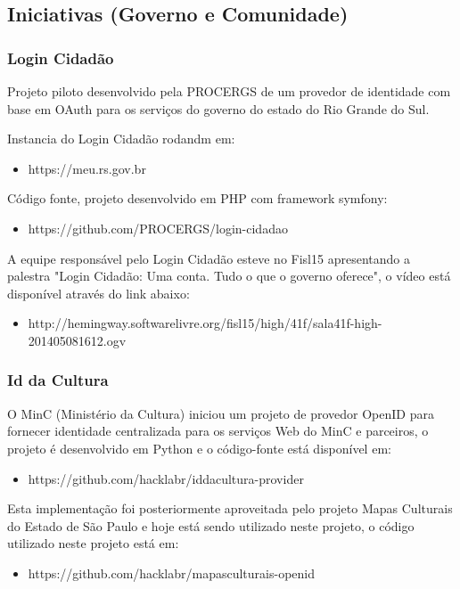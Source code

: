 \documentclass[11pt]{article}
\begin{document}
\subsection{Iniciativas (Governo e Comunidade)}

\subsubsection{Login Cidadão}

Projeto piloto desenvolvido pela PROCERGS de um provedor de identidade com
base em OAuth para os serviços do governo do estado do Rio Grande do Sul.

Instancia do Login Cidadão rodandm em:
\begin{itemize}
  \item{https://meu.rs.gov.br}
\end{itemize}

Código fonte, projeto desenvolvido em PHP com framework symfony:
\begin{itemize}
  \item{https://github.com/PROCERGS/login-cidadao}
\end{itemize}

A equipe responsável pelo Login Cidadão esteve no Fisl15 apresentando a
palestra "Login Cidadão: Uma conta. Tudo o que o governo oferece", o vídeo
está disponível através do link abaixo:
\begin{itemize}
  \item{http://hemingway.softwarelivre.org/fisl15/high/41f/sala41f-high-201405081612.ogv}
\end{itemize}

\subsubsection{Id da Cultura}

O MinC (Ministério da Cultura) iniciou um projeto de provedor OpenID para
fornecer identidade centralizada para os serviços Web do MinC e parceiros, o
projeto é desenvolvido em Python e o código-fonte está disponível em:
\begin{itemize}
  \item{https://github.com/hacklabr/iddacultura-provider}
\end{itemize}

Esta implementação foi posteriormente aproveitada pelo projeto Mapas Culturais
do Estado de São Paulo e hoje está sendo utilizado neste projeto, o código
utilizado neste projeto está em:
\begin{itemize}
  \item{https://github.com/hacklabr/mapasculturais-openid}
\end{itemize}
\end{document}
